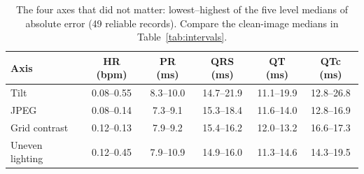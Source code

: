 \begin{table}[ht]
\centering\small
\caption{The four axes that did not matter: lowest--highest of the five level medians of absolute error (49 reliable records). Compare the clean-image medians in Table~\ref{tab:intervals}.}\label{tab:flat}
\begin{tabular}{@{}lccccc@{}}
\toprule
Axis & HR (bpm) & PR (ms) & QRS (ms) & QT (ms) & QTc (ms) \\
\midrule
Tilt & 0.08--0.55 & 8.3--10.0 & 14.7--21.9 & 11.1--19.9 & 12.8--26.8 \\
JPEG & 0.08--0.14 & 7.3--9.1 & 15.3--18.4 & 11.6--14.0 & 12.8--16.9 \\
Grid contrast & 0.12--0.13 & 7.9--9.2 & 15.4--16.2 & 12.0--13.2 & 16.6--17.3 \\
Uneven lighting & 0.12--0.45 & 7.9--10.9 & 14.9--16.0 & 11.3--14.6 & 14.3--19.5 \\
\bottomrule
\end{tabular}
\end{table}